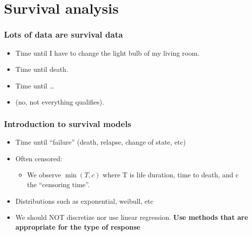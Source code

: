  










\section[Survival]{Survival analysis}

\begin{frame}
  \frametitle{Lots of data are survival data}
  \begin{itemize}
  \item Time until I have to change the light bulb of my living room.
  \item Time until death.
  \item Time until \ldots
  \item (no, not everything qualifies).
  \end{itemize}
\end{frame}



\begin{frame}
\frametitle{Introduction to survival models}
\begin{itemize}
\item Time until ``failure'' (death, relapse, change of state, etc)
\item Often censored:
  \begin{itemize}
  \item We observe $\min(T, c)$  where T is life duration, time to death, and
  c the ``censoring time''.
  \end{itemize}
\item Distributions such as exponential, weibull, etc
\item We should NOT discretize nor use linear regression. \textbf{Use
    methods that are appropriate for the type of response}
\end{itemize}
\end{frame}



